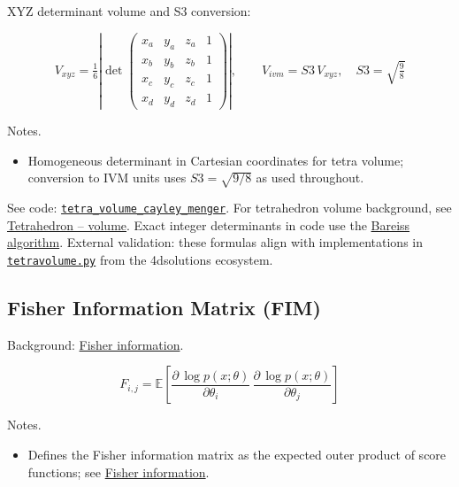 \documentclass[
  10pt,
]{article}
\providecommand{\tightlist}{%
  \setlength{\itemsep}{0pt}\setlength{\parskip}{0pt}}
\begin{document}
XYZ determinant volume and S3 conversion:

\begin{equation}\label{eq:supp_xyz_det}
V_{xyz} = \tfrac{1}{6} \left| \det \begin{pmatrix}
 x_a & y_a & z_a & 1 \\
 x_b & y_b & z_b & 1 \\
 x_c & y_c & z_c & 1 \\
  x_d & y_d & z_d & 1
\end{pmatrix} \right|, \qquad V_{ivm} = S3\, V_{xyz},\quad S3=\sqrt{\tfrac{9}{8}}
\end{equation}

Notes.

\begin{itemize}
\tightlist
\item
  Homogeneous determinant in Cartesian coordinates for tetra volume;
  conversion to IVM units uses \(S3=\sqrt{9/8}\) as used throughout.
\end{itemize}

See code:
\href{03_quadray_methods.md\#code:tetra_volume_cayley_menger}{\texttt{tetra\_volume\_cayley\_menger}}.
For tetrahedron volume background, see
\href{https://en.wikipedia.org/wiki/Tetrahedron\#Volume}{Tetrahedron --
volume}. Exact integer determinants in code use the
\href{https://en.wikipedia.org/wiki/Bareiss_algorithm}{Bareiss
algorithm}. External validation: these formulas align with
implementations in
\href{https://github.com/4dsolutions/m4w/blob/main/tetravolume.py}{\texttt{tetravolume.py}}
from the 4dsolutions ecosystem.

\hypertarget{eq:fim}{%
\subsection{Fisher Information Matrix (FIM)}\label{eq:fim}}

Background:
\href{https://en.wikipedia.org/wiki/Fisher_information}{Fisher
information}.

\begin{equation}\label{eq:supp_fim}
F_{i,j} = \mathbb{E}\left[ \frac{\partial \, \log p(x;\theta)}{\partial \theta_i}\, \frac{\partial \, \log p(x;\theta)}{\partial \theta_j} \right]
\end{equation}

Notes.

\begin{itemize}
\tightlist
\item
  Defines the Fisher information matrix as the expected outer product of
  score functions; see
  \href{https://en.wikipedia.org/wiki/Fisher_information}{Fisher
  information}.
\end{itemize}
\end{document}
